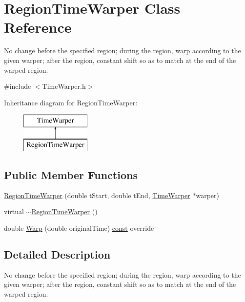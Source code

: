 \hypertarget{class_region_time_warper}{}\section{Region\+Time\+Warper Class Reference}
\label{class_region_time_warper}


No change before the specified region; during the region, warp according to the given warper; after the region, constant shift so as to match at the end of the warped region.  




{\ttfamily \#include $<$Time\+Warper.\+h$>$}

Inheritance diagram for Region\+Time\+Warper\+:\begin{figure}[H]
\begin{center}
\leavevmode
\includegraphics[height=2.000000cm]{class_region_time_warper}
\end{center}
\end{figure}
\subsection*{Public Member Functions}
\begin{DoxyCompactItemize}
\item 
\hyperlink{class_region_time_warper_afb7cad0d2929318e60ce7107a67df8e5}{Region\+Time\+Warper} (double t\+Start, double t\+End, \hyperlink{class_time_warper}{Time\+Warper} $\ast$warper)
\item 
virtual \hyperlink{class_region_time_warper_ae6a0499e0b0a4e42f0f08694a88cf325}{$\sim$\+Region\+Time\+Warper} ()
\item 
double \hyperlink{class_region_time_warper_ae5b65c06bfe9f3517ae1906124224d9d}{Warp} (double original\+Time) \hyperlink{getopt1_8c_a2c212835823e3c54a8ab6d95c652660e}{const}  override
\end{DoxyCompactItemize}


\subsection{Detailed Description}
No change before the specified region; during the region, warp according to the given warper; after the region, constant shift so as to match at the end of the warped region. 

